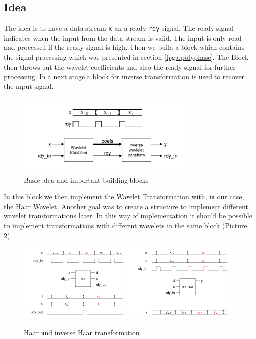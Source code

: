 \begin{refsection}
\subsection{Idea}

The idea is to have a data stream \texttt{x} an a ready \texttt{rdy} signal. The ready signal indicates when the input from the data stream is valid. The input is only read and processed if the ready signal is high. Then we build a block which contains the signal processing which was presented in section \ref{fpga:polyphase}. The Block then throws out the wavelet coefficients and also the ready signal for further processing. In a next stage a block for inverse transformation is used to recover the input signal.

\begin{figure}
	\centering
	\includegraphics[width=0.8\textwidth]{images/idea.pdf}
	\caption{Basic idea and important building blocks \label{fpga:idea}}
\end{figure}
In this block we then implement the Wavelet Transformation with, in our case, the Haar Wavelet. Another goal was to create a structure to implement different wavelet transformations later. In this way of implementation  it should be possible to implement transformations with different wavelets in the same block (Picture \ref{fpga:haar_inv_haar}). 

\begin{figure}[h]
	\includegraphics[width=0.49\textwidth]{images/haar.pdf}
	\includegraphics[width=0.49\textwidth]{images/inv_haar.pdf}
	\caption{Haar und inverse Haar transformation \label{fpga:haar_inv_haar}}
\end{figure}


\end{refsection}
